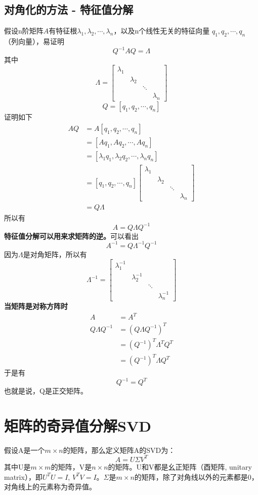 \documentclass[]{article}
\begin{document}
\subsection{对角化的方法 - 特征值分解}
假设n阶矩阵$ A $有特征根$\lambda_1,  \lambda_2, \cdots, \lambda_n$，以及n个线性无关的特征向量 $ q_1, q_2, \cdots, q_n $（列向量），易证明
\[ 
Q^{-1}AQ = \Lambda
 \]
其中
\[ 
\Lambda =
\begin{bmatrix}
\lambda_1 & & & \\
& \lambda_2 & & \\
& & \ddots & \\
& & & \lambda_n
\end{bmatrix}
 \]
\[ 
Q = [q_1, q_2, \cdots, q_n]
 \]
证明如下
\[ 
\begin{aligned}
AQ &= A[q_1, q_2, \cdots, q_n] \\
   &= [Aq_1, Aq_2, \cdots, Aq_n] \\
   &= [\lambda_1 q_1, \lambda_2 q_2, \cdots, \lambda_n q_n] \\
   &=  
   [q_1, q_2, \cdots, q_n] 
   \begin{bmatrix}
   \lambda_1 & & & \\
   & \lambda_2 & & \\
   & & \ddots & \\
   & & & \lambda_n
   \end{bmatrix}   \\
   &= Q\Lambda
\end{aligned}
 \]
所以有
\[ 
A = Q\Lambda Q^{-1}
 \]
\textbf{特征值分解可以用来求矩阵的逆。}可以看出
\[ 
A^{-1} = Q\Lambda^{-1}Q^{-1}
 \]
因为$ \Lambda $是对角矩阵，所以有
\[ 
\Lambda^{-1} =
\begin{bmatrix}
\lambda_1^{-1} & & & \\
& \lambda_2^{-1} & & \\
& & \ddots & \\
& & & \lambda_n^{-1}
\end{bmatrix}
\]
\textbf{当矩阵是对称方阵时}
\[ 
\begin{aligned}
A &= A^T \\
Q\Lambda Q^{-1} &= (Q\Lambda Q^{-1})^T \\
                &= (Q^{-1})^T\Lambda^T Q^T \\
                &= (Q^{-1})^T\Lambda Q^T
\end{aligned}
 \]
于是有
\[ 
Q^{-1} = Q^T
 \]
也就是说，Q是正交矩阵。


\section{矩阵的奇异值分解SVD}
假设A是一个$ m \times n$的矩阵，那么定义矩阵A的SVD为：
\[ 
A = U\Sigma V^T
 \]
其中U是$ m\times m $的矩阵，V是$ n\times n $的矩阵。U和V都是幺正矩阵（酉矩阵, unitary matrix），即$ U^T U = I $, $ V^T V = I $。$ \Sigma $是$ m \times n$的矩阵，除了对角线以外的元素都是0，对角线上的元素称为奇异值。
\end{document}
